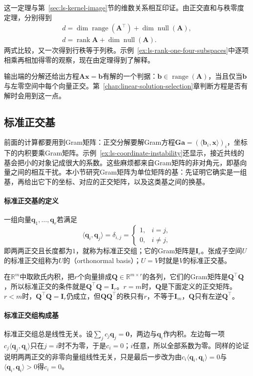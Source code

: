 这一定理与第~\ref{sec:ls-kernel-image}节的维数关系相互印证。由正交直和与秩零度定理，分别得到
\[
 \begin{gathered}
d=\dim\operatorname{range}(\bm A^\top)+\dim\operatorname{null}(\bm A),\\
d=\operatorname{rank}\bm A+\dim\operatorname{null}(\bm A).
 \end{gathered}
\]
两式比较，又一次得到行秩等于列秩。示例~\ref{ex:ls-rank-one-four-subspaces}中逐项相乘再相加得零的观察，现在由定理得到了解释。

输出端的分解还给出方程$\bm A\bm x=\bm b$有解的一个判据：$\bm b\in\operatorname{range}(\bm A)$，当且仅当$\bm b$与左零空间中每个向量正交。第~\ref{chap:linear-solution-selection}章判断方程是否有解时会用到这一点。

\subsection{标准正交基}
\label{sec:ls-orthonormal-bases}

前面的计算都要用到Gram矩阵：正交分解要解Gram方程$\bm G\bm a=(\langle\bm b_i,\bm x\rangle)_i$，坐标下的内积要乘Gram矩阵。示例~\ref{ex:ls-coordinate-instability}还显示，接近共线的基会把小的对象记成很大的系数。这些麻烦都来自Gram矩阵的非对角元，即基向量之间的相互干扰。本小节研究Gram矩阵为单位矩阵的基：先证明它确实是一组基，再给出它下的坐标、对应的正交矩阵，以及这类基之间的换基。

\paragraph{标准正交基的定义}
一组向量$\bm q_1,\ldots,\bm q_r$若满足
\[
 \langle\bm q_i,\bm q_j\rangle=\delta_{i,j}=\begin{cases}1,&i=j,\\0,&i\neq j,\end{cases}
\]
即两两正交且长度都为$1$，就称为标准正交组；它的Gram矩阵是$\bm I_r$。张成子空间$U$的标准正交组称为$U$的（orthonormal basis）；$U=V$时就是$V$的标准正交基。

在$\mathbb R^m$中取欧氏内积，把$r$个向量排成$\bm Q\in\mathbb R^{m\times r}$的各列，它们的Gram矩阵是$\bm Q^\top\bm Q$，所以标准正交的条件就是$\bm Q^\top\bm Q=\bm I_r$。$r=m$时，$\bm Q$是下面定义的正交矩阵。$r<m$时，$\bm Q^\top\bm Q=\bm I_r$仍成立，但$\bm Q\bm Q^\top$的秩只有$r$，不等于$\bm I_m$，$\bm Q$只有左逆$\bm Q^\top$。

\paragraph{标准正交组构成基}
标准正交组总是线性无关。设$\sum_jc_j\bm q_j=\bm0$，两边与$\bm q_i$作内积。左边每一项$c_j\langle\bm q_j,\bm q_i\rangle$只在$j=i$时不为零，于是$c_i=0$；$i$任意，所以全部系数为零。同样的论证说明两两正交的非零向量组线性无关，只是最后一步改为由$c_i\langle\bm q_i,\bm q_i\rangle=0$与$\langle\bm q_i,\bm q_i\rangle>0$得$c_i=0$。

